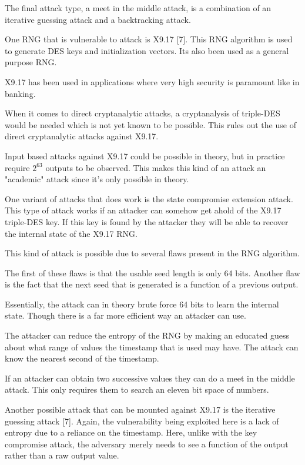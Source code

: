 \documentclass{article}
\begin{document}
    The final attack type, a meet in the middle attack, is a combination
    of an iterative guessing attack and a backtracking attack.


    One RNG that is vulnerable to attack is X9.17 [7]. This RNG algorithm
    is used to generate DES keys and initialization vectors.
    Its also been used as a general purpose RNG.

    X9.17 has been used in applications where very high security is paramount like in
    banking.

    When it comes to direct cryptanalytic attacks, a cryptanalysis of triple-DES
    would be needed which is not yet known to be possible.
    This rules out the use of direct cryptanalytic attacks against X9.17.

    Input based attacks against X9.17 could be possible in theory, but in practice
    require $2^{63}$ outputs to be observed. This makes this kind
    of an attack an "academic" attack since it's only possible in theory.

    One variant of attacks that does work is the state compromise extension attack.
    This type of attack works if an attacker can somehow get ahold of the X9.17
    triple-DES key. If this key is found by the attacker they will be able
    to recover the internal state of the X9.17 RNG.

    This kind of attack is possible due to several flaws present in the RNG algorithm.

    The first of these flaws is that the usable seed length is only 64 bits.
    Another flaw is the fact that the next seed that is generated is a function
    of a previous output.

    Essentially, the attack can in theory brute force 64 bits to learn the internal state.
    Though there is a far more efficient way an attacker can use.

    The attacker can reduce the entropy of the RNG by making an educated guess
    about what range of values the timestamp that is used may have.
    The attack can know the nearest second of the timestamp.

    If an attacker can obtain two successive values they can do a meet in the middle attack.
    This only requires them to search an eleven bit space of numbers.

    Another possible attack that can be mounted against X9.17 is the iterative guessing
    attack [7]. Again, the vulnerability being exploited here is a lack of entropy
    due to a reliance on the timestamp. Here, unlike with the key compromise attack,
    the adversary merely needs to see a function of the output rather than a raw output
    value.
\end{document}
